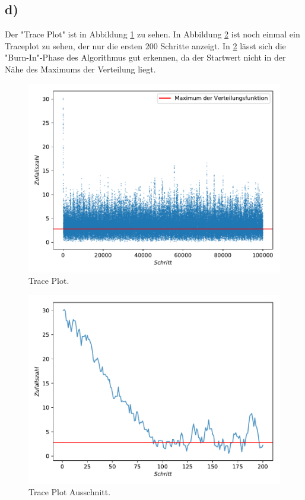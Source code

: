 \subsection{d)}
Der "Trace Plot" ist in Abbildung \ref{abb:2} zu sehen. In Abbildung \ref{abb:3} ist noch einmal ein Traceplot zu sehen,
der nur die ersten 200 Schritte anzeigt.
In  \ref{abb:3} lässt sich die "Burn-In"-Phase des Algorithmus gut erkennen, da der Startwert
nicht in der Nähe des Maximums der Verteilung liegt.
\begin{figure}[h]
  \centering
  \includegraphics{MetropolisSchritte.pdf}
  \caption{Trace Plot.}
  \label{abb:2}
\end{figure}
\begin{figure}[h]
  \centering
  \includegraphics{MetropolisSchritte2.pdf}
  \caption{Trace Plot Ausschnitt.}
  \label{abb:3}
\end{figure}

